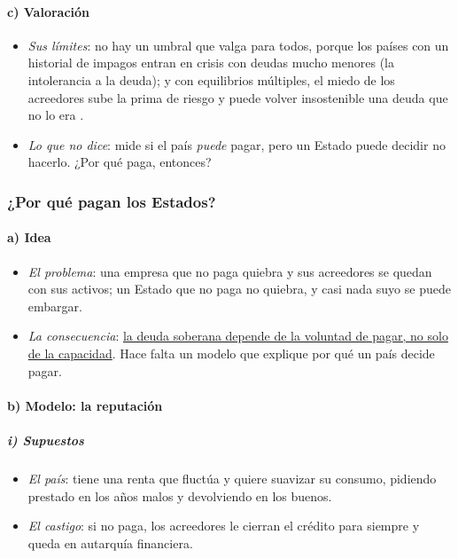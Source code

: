 \documentclass[11pt]{article}
\begin{document}
\paragraph{c) Valoración}

\begin{itemize}
\item \emph{Sus límites}: no hay un umbral que valga para todos, porque los países con un historial de impagos entran en crisis con deudas mucho menores (la intolerancia a la deuda)\nocite{Reinhart2003Intolerancia}; y con equilibrios múltiples, el miedo de los acreedores sube la prima de riesgo y puede volver insostenible una deuda que no lo era .
\item \emph{Lo que no dice}: mide si el país \emph{puede} pagar, pero un Estado puede decidir no hacerlo. ¿Por qué paga, entonces?
\end{itemize}

\subsubsection{¿Por qué pagan los Estados?}\label{sec:impago}

\paragraph{a) Idea}

\begin{itemize}
\item \emph{El problema}: una empresa que no paga quiebra y sus acreedores se quedan con sus activos; un Estado que no paga no quiebra, y casi nada suyo se puede embargar.
\item \emph{La consecuencia}: \uline{la deuda soberana depende de la voluntad de pagar, no solo de la capacidad}. Hace falta un modelo que explique por qué un país decide pagar.
\end{itemize}

\paragraph{b) Modelo: la reputación}

\subparagraph{i) Supuestos}

\begin{itemize}
\item \emph{El país}: tiene una renta que fluctúa y quiere suavizar su consumo, pidiendo prestado en los años malos y devolviendo en los buenos\nocite{EatonGersovitz1981}.
\item \emph{El castigo}: si no paga, los acreedores le cierran el crédito para siempre y queda en autarquía financiera.
\end{itemize}
\end{document}
